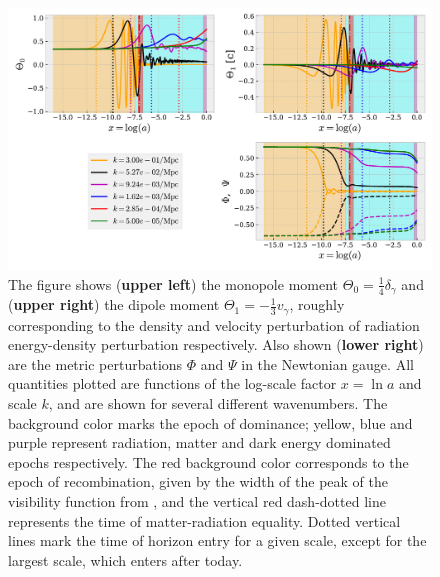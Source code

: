 \documentclass[twocolumn]{aastex62}
\begin{document}
\begin{figure}
    \includegraphics[scale = 0.65]{Figures/fig1.pdf}
    \caption{The figure shows (\textbf{upper left}) the monopole moment $\Theta_0 = \frac{1}{4}\delta_\gamma$ and (\textbf{upper right}) the dipole moment $\Theta_1 = -\frac{1}{3}v_\gamma$, roughly corresponding to the density and velocity perturbation of radiation energy-density perturbation respectively. Also shown (\textbf{lower right}) are the metric perturbations $\Phi$ and $\Psi$ in the Newtonian gauge. All quantities plotted are functions of the log-scale factor $x = \ln a$ and scale $k$, and are shown for several different wavenumbers. The background color marks the epoch of dominance; yellow, blue and purple represent radiation, matter and dark energy dominated epochs respectively. The red background color corresponds to the epoch of recombination, given by the width of the peak of the visibility function from \cite{stutzer:2020b}, and the vertical red dash-dotted line represents the time of matter-radiation equality. Dotted vertical lines mark the time of horizon entry for a given scale, except for the largest scale, which enters after today.} 
    \label{fig:fig1}
\end{figure}
\end{document}
